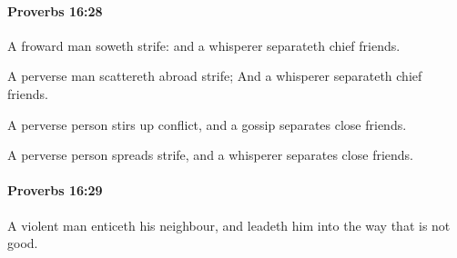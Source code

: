 		\paragraph{Proverbs 16:28} %
			\label{PROVERBS-16-28}

			A froward man soweth strife: and a whisperer separateth chief friends.

			\begin{versebox}
					\item[BHS] 
					\item[ASV] A perverse man scattereth abroad strife; And a whisperer separateth chief friends.
					\item[NIV] A perverse person stirs up conflict, and a gossip separates close friends.
					\item[NRSV] A perverse person spreads strife, and a whisperer separates close friends.
			\end{versebox}

		\paragraph{Proverbs 16:29} %
			\label{PROVERBS-16-29}

			A violent man enticeth his neighbour, and leadeth him into the way that is not good.

